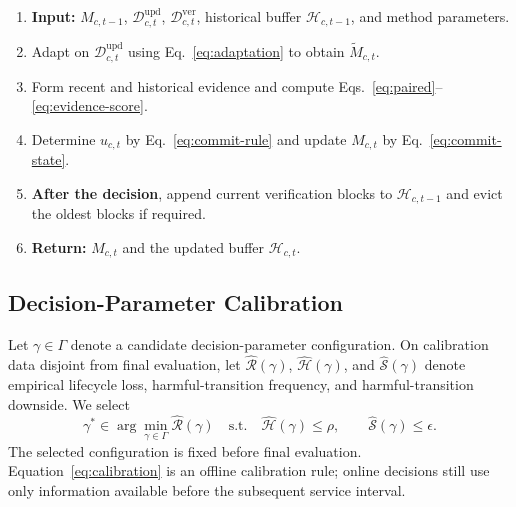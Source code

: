 \begin{Algorithm}
\label{alg:method}
\normalfont\small
\setlength{\emergencystretch}{1.5em}
\begin{enumerate}[label=\arabic*.,leftmargin=2.2em,labelwidth=1.2em,labelsep=0.4em,itemsep=0pt,topsep=1pt]
\item \textbf{Input:} $M_{c,t-1}$, $\mathcal D^{\mathrm{upd}}_{c,t}$, $\mathcal D^{\mathrm{ver}}_{c,t}$, historical buffer $\mathcal H_{c,t-1}$, and method parameters.
\item Adapt on $\mathcal D^{\mathrm{upd}}_{c,t}$ using Eq.~\eqref{eq:adaptation} to obtain $\widetilde M_{c,t}$.
\item Form recent and historical evidence and compute Eqs.~\eqref{eq:paired}--\eqref{eq:evidence-score}.
\item Determine $u_{c,t}$ by Eq.~\eqref{eq:commit-rule} and update $M_{c,t}$ by Eq.~\eqref{eq:commit-state}.
\item \textbf{After the decision}, append current verification blocks to $\mathcal H_{c,t-1}$ and evict the oldest blocks if required.
\item \textbf{Return:} $M_{c,t}$ and the updated buffer $\mathcal H_{c,t}$.
\end{enumerate}
\end{Algorithm}

\subsection{Decision-Parameter Calibration}
Let $\gamma\in\Gamma$ denote a candidate decision-parameter configuration. On calibration data disjoint from final evaluation, let $\widehat{\mathcal R}(\gamma)$, $\widehat{\mathcal H}(\gamma)$, and $\widehat{\mathcal S}(\gamma)$ denote empirical lifecycle loss, harmful-transition frequency, and harmful-transition downside. We select
\begin{equation}
\gamma^{*}\in\arg\min_{\gamma\in\Gamma}\widehat{\mathcal R}(\gamma)
\quad\mathrm{s.t.}\quad
\widehat{\mathcal H}(\gamma)\leq\rho,\qquad
\widehat{\mathcal S}(\gamma)\leq\epsilon.
\label{eq:calibration}
\end{equation}
The selected configuration is fixed before final evaluation. Equation~\eqref{eq:calibration} is an offline calibration rule; online decisions still use only information available before the subsequent service interval.
